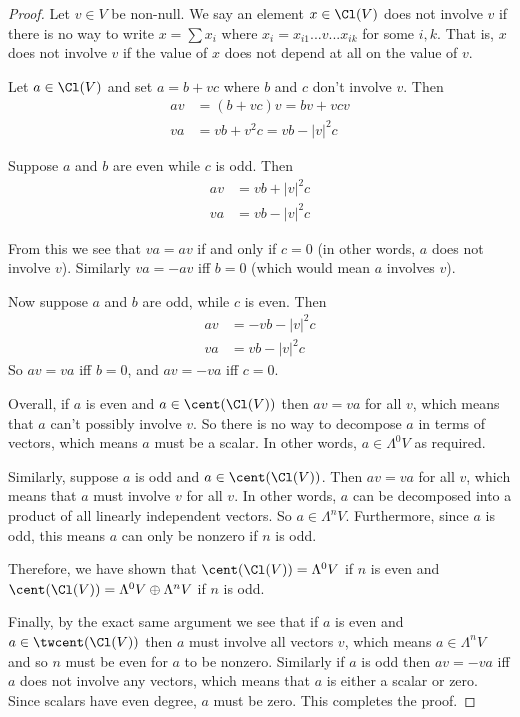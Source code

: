 \begin{proof}
    Let $v \in V$ be non-null. 
    We say an element $x\in \Cl(V)$ does not involve $v$ if there is no way to write $x = \sum x_i$ where $x_i = x_{i1}...v...x_{ik}$ for some $i,k$. That is, $x$ does not involve $v$ if the value of $x$ does not depend at all on the value of $v$.
    
    Let $a\in \Cl(V)$ and set $a = b + vc$ where $b$ and $c$ don't involve $v$. Then 
    \begin{align*}av &= (b+vc)v=bv+vcv\\
    va &= vb+v^2c = vb-|v|^2c\end{align*}
    
    Suppose $a$ and $b$ are even while $c$ is odd. Then 
    \begin{align*}av &= vb + |v|^2 c\\
    va &= vb - |v|^2 c
    \end{align*}
    
    From this we see that $va = av$ if and only if $c=0$ (in other words, $a$ does not involve $v$). Similarly $va=-av$ iff $b=0$ (which would mean $a$ involves $v$).

    Now suppose $a$ and $b$ are odd, while $c$ is even. Then
    \begin{align*}
        av &= -vb-|v|^2 c\\
        va &= vb - |v|^2 c
    \end{align*}
    So $av = va$ iff $b=0$, and $av=-va$ iff $c=0$.

    Overall, if $a$ is even and $a \in \cent(\Cl(V))$ then $av=va$ for all $v$, which means that $a$ can't possibly involve $v$. So there is no way to decompose $a$ in terms of vectors, which means $a$ must be a scalar. In other words, $a \in \Lambda^0 V$ as required.

    Similarly, suppose $a$ is odd and $a \in \cent(\Cl(V))$. Then $av=va$ for all $v$, which means that $a$ must involve $v$ for all $v$. In other words, $a$ can be decomposed into a product of all linearly independent vectors. So $a \in\Lambda^n V$. Furthermore, since $a$ is odd, this means $a$ can only be nonzero if $n$ is odd. 

    Therefore, we have shown that $\cent(\Cl(V)) = \Lambda^0 V$ if $n$ is even and $\cent(\Cl(V)) = \Lambda^0 V \oplus \Lambda^n V$ if $n$ is odd.

    Finally, by the exact same argument we see that if $a$ is even and $a\in \twcent(\Cl(V))$ then $a$ must involve all vectors $v$, which means $a \in \Lambda^n V$ and so $n$ must be even for $a$ to be nonzero. Similarly if $a$ is odd then $av=-va$ iff $a$ does not involve any vectors, which means that $a$ is either a scalar or zero. Since scalars have even degree, $a$ must be zero. This completes the proof.
\end{proof}
